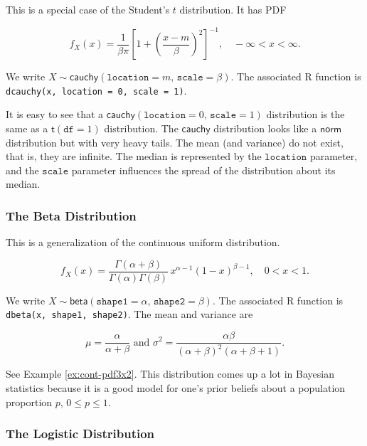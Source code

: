 \documentclass[]{book}
\numberwithin{equation}{chapter}
\numberwithin{figure}{chapter}
\theoremstyle{plain}
\theoremstyle{definition}
\theoremstyle{remark}
\theoremstyle{definition}
\theoremstyle{definition}
\theoremstyle{remark}
\begin{document}
This is a special case of the Student's \(t\) distribution. It has PDF

\begin{equation}
f_{X}(x) = \frac{1}{\beta\pi} \left[ 1+\left( \frac{x-m}{\beta} \right)^{2} \right]^{-1},\quad -\infty < x < \infty.
\end{equation}

We write
\(X \sim \mathsf{cauchy}(\mathtt{location} = m,\,\mathtt{scale} = \beta)\).
The associated R function is
\texttt{dcauchy(x,\ location\ =\ 0,\ scale\ =\ 1)}.

It is easy to see that a
\(\mathsf{cauchy}(\mathtt{location} = 0,\,\mathtt{scale} = 1)\)
distribution is the same as a \(\mathsf{t}(\mathtt{df}=1)\)
distribution. The \(\mathsf{cauchy}\) distribution looks like a
\(\mathsf{norm}\) distribution but with very heavy tails. The mean (and
variance) do not exist, that is, they are infinite. The median is
represented by the \(\mathtt{location}\) parameter, and the
\(\mathtt{scale}\) parameter influences the spread of the distribution
about its median.

\subsubsection{The Beta Distribution}\label{sub-the-beta-distribution}

This is a generalization of the continuous uniform distribution.

\begin{equation}
f_{X}(x)=\frac{\Gamma(\alpha+\beta)}{\Gamma(\alpha)\Gamma(\beta)}\, x^{\alpha-1}(1-x)^{\beta-1},\quad 0 < x < 1.
\end{equation}

We write
\(X\sim\mathsf{beta}(\mathtt{shape1}=\alpha,\,\mathtt{shape2}=\beta)\).
The associated R function is \texttt{dbeta(x,\ shape1,\ shape2)}. The
mean and variance are

\begin{equation} 
\mu=\frac{\alpha}{\alpha+\beta}\mbox{ and }\sigma^{2}=\frac{\alpha\beta}{\left(\alpha+\beta\right)^{2}\left(\alpha+\beta+1\right)}.
\end{equation}

See Example \ref{ex:cont-pdf3x2}. This distribution comes up a lot in
Bayesian statistics because it is a good model for one's prior beliefs
about a population proportion \(p\), \(0\leq p\leq1\).

\subsubsection{The Logistic
Distribution}\label{sub-the-logistic-distribution}
\end{document}
